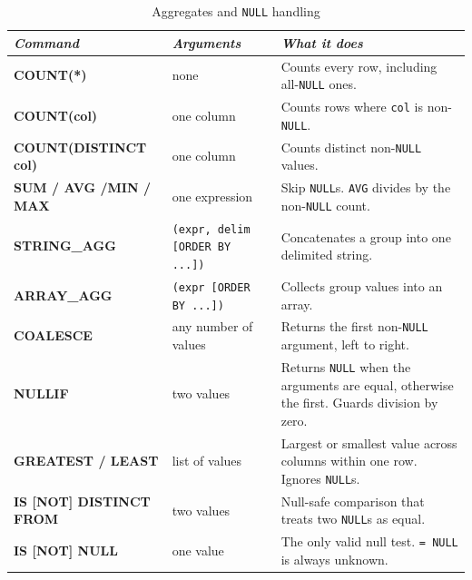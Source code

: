 \begin{table}[H]
\centering
\footnotesize
\renewcommand{\arraystretch}{1.4}
\begin{tabularx}{\textwidth}{>{\raggedright\arraybackslash}p{} >{\raggedright\arraybackslash}p{} >{\raggedright\arraybackslash}X}
\toprule
\textit{Command} & \textit{Arguments} & \textit{What it does} \\
\midrule
\textbf{COUNT(*)} & none & Counts every row, including all-\texttt{NULL} ones. \\
\textbf{COUNT(col)} & one column & Counts rows where \texttt{col} is non-\texttt{NULL}. \\
\textbf{COUNT(\allowbreak DISTINCT col)} & one column & Counts distinct non-\texttt{NULL} values. \\
\textbf{SUM / AVG /\allowbreak MIN / MAX} & one expression & Skip \texttt{NULL}s. \texttt{AVG} divides by the non-\texttt{NULL} count. \\
\textbf{STRING\_AGG} & \texttt{(expr, delim [ORDER BY ...])} & Concatenates a group into one delimited string. \\
\textbf{ARRAY\_AGG} & \texttt{(expr [ORDER BY ...])} & Collects group values into an array. \\
\textbf{COALESCE} & any number of values & Returns the first non-\texttt{NULL} argument, left to right. \\
\textbf{NULLIF} & two values & Returns \texttt{NULL} when the arguments are equal, otherwise the first. Guards division by zero. \\
\textbf{GREATEST / LEAST} & list of values & Largest or smallest value across columns within one row. Ignores \texttt{NULL}s. \\
\textbf{IS [NOT] DISTINCT FROM} & two values & Null-safe comparison that treats two \texttt{NULL}s as equal. \\
\textbf{IS [NOT] NULL} & one value & The only valid null test. \texttt{= NULL} is always unknown. \\
\bottomrule
\end{tabularx}
\caption*{Aggregates and \texttt{NULL} handling}
\end{table}

\vspace{-2ex}
